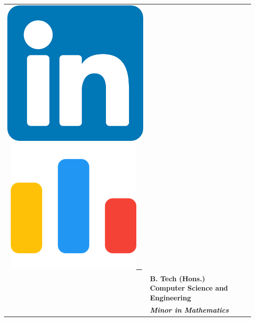 \documentclass[article]{article}
\newcommand{\myfont}[2]{\fontsize{#1}{#1}\selectfont #2}
\begin{document}
\begin{minipage}{0.9\linewidth}
\begin{tabular}{l l l}
{{\href{https://www.linkedin.com/in/snehadeep-gayen/}{\includegraphics[scale=0.05]{linkedin.png}} \ \href{https://codeforces.com/profile/Snehadeep}{\includegraphics[scale=0.06]{cf.png} \ } 
        }}
        \\
        & \myfont{12}{\textbf{B. Tech (Hons.) Computer Science and Engineering}}
        \\
        & {\textbf{\textit{Minor in Mathematics}}} 
        \\
    \end{tabular}
\end{minipage}\hfill
\unskip
\end{document}
